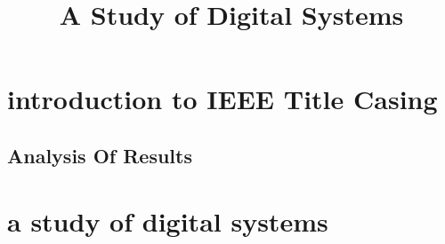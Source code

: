 \documentclass{article}
\title{A Study of Digital Systems}
\begin{document}
\section{introduction to IEEE Title Casing}
\subsection*{Analysis Of Results}
\section{a study of digital systems}
\end{document}
